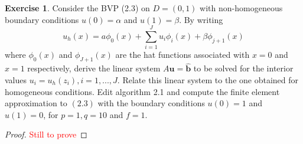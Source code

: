 \documentclass{amsart}
\theoremstyle{plain}
\theoremstyle{definition}
\newtheorem{exer}{Exercise}[section]
\newcommand{\tcr}[1]{\textcolor{red}{#1}}
\begin{document}
\begin{exer}
    Consider the BVP (2.3) on $D = (0,1)$ with non-homogeneous boundary conditions $u(0)=\alpha$ and $u(1)=\beta.$ By writing 
    $$u_h(x) = a\phi_0(x) + \sum_{i=1}^{J} u_i \phi_i(x) + \beta \phi_{j+1}(x)$$
    where $\phi_0(x)$ and $\phi_{J+1}(x)$ are the hat functions associated with $x=0$ and $x=1$ respectively, derive the linear system $A\mathbf{u} = \hat{\mathbf{b}}$ to be solved for the interior values $u_i = u_h (z_i), i = 1,...,J.$ Relate this linear system to the one obtained for homogeneous conditions. Edit algorithm 2.1 and compute the finite element approximation to $(2.3)$ with the boundary conditions $u(0)=1$ and $u(1)=0$, for $p=1, q=10$ and $f=1.$
\end{exer}
\begin{proof}
    \tcr{Still to prove}
\end{proof}

\printbibliography
\end{document}
